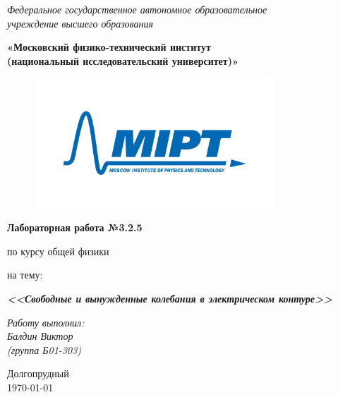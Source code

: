 \documentclass[a4paper,12pt]{extarticle}
\begin{document}
\thispagestyle{empty}
\begin{center}
	\textit{Федеральное государственное автономное образовательное\\ учреждение высшего образования }

	\vspace{0.5ex}

	\textbf{«Московский физико-технический институт\\ (национальный исследовательский университет)»}
\end{center}

\vspace{10ex}
\begin{figure}[!h]
  \begin{center}
    \includegraphics[width = 0.8\textwidth]{MIPT.png}
  \end{center}
\end{figure}

\begin{center}

	\textbf{Лабораторная работа №3.2.5}

	\vspace{1ex}

	по курсу общей физики

	на тему:

	\textbf{\textit{<<Свободные и вынужденные
колебания в электрическом контуре>>}}

	\vspace{20ex}

	\begin{flushright}
		\noindent
		\textit{Работу выполнил:}\\
		\textit{Балдин Виктор \\(группа Б01-303)}
	\end{flushright}
	\vfill
	Долгопрудный \\ \today
	\setcounter{page}{1}
\end{center}
\newpage
\end{document}
